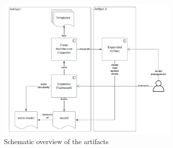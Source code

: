 \begin{figure}[H]
    \centering
    \includegraphics[width=0.8\textwidth]{figures/artifactOverview.pdf}
    \caption[Schematic overview of the artifacts]{Schematic overview of the artifacts}
    \label{fig_overview_design}
  \end{figure}






